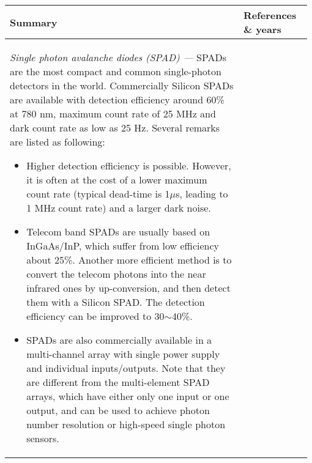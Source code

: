\begin{table*}[!htbp]
	\begin{tabular}{|p{0.755\linewidth}|p{0.22\linewidth}|}
		\hline
		Summary & References \& years \\
		\hline \hline
		\textit{Single photon avalanche diodes (SPAD) ---}
		SPADs are the most compact and common single-photon detectors in the world. Commercially Silicon SPADs are available with detection efficiency around 60\% at 780 nm, maximum count rate of 25 MHz and dark count rate as low as 25 Hz. Several remarks are listed as following:
		
		\begin{itemize}
			
			\item Higher detection efficiency is possible. However, it is often at the cost of a lower maximum count rate (typical dead-time is 1$\mu$s, leading to 1 MHz count rate) and a larger dark noise.
			
			\item Telecom band SPADs are usually based on InGaAs/InP, which suffer from low efficiency about 25\%. Another more efficient method is to convert the telecom photons into the near infrared ones by up-conversion, and then detect them with a Silicon SPAD. The detection efficiency can be improved to 30$\sim$40\%.
			
			\item SPADs are also commercially available in a multi-channel array with single power supply and individual inputs/outputs. Note that they are different from the multi-element SPAD arrays, which have either only one input or one output, and can be used to achieve photon number resolution or high-speed single photon sensors.
			

\end{itemize}
\end{tabular}
\end{table*}
